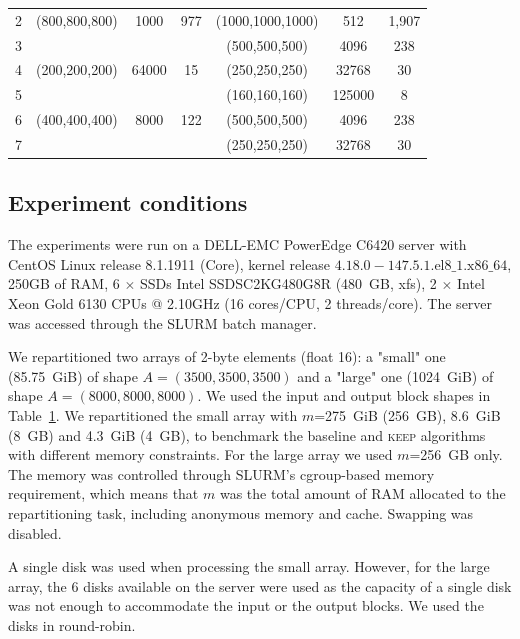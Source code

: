 \documentclass[sigconf, nonacm]{acmart}
\newcommand{\keep}[0]{\textsc{keep}\xspace}
\begin{document}
\begin{table}
\begin{tabular}{c|ccc|ccc}
   \rowcolor{black!10}
   2 & (800,800,800) & 1000     & 977    & (1000,1000,1000) & 512     &  1,907 \\
   \rowcolor{black!10}
   3 &               &        &           & (500,500,500)  & 4096    & 238 \\
   4 & (200,200,200) & 64000     & 15    & (250,250,250) & 32768     &  30 \\
   5 &               &        &           & (160,160,160)  & 125000    & 8 \\
   \rowcolor{black!10}
   6 & (400,400,400) & 8000     & 122    & (500,500,500) & 4096     &  238 \\
   \rowcolor{black!10}
   7 &               &        &           & (250,250,250)  & 32768    & 30 \\

   \end{tabular}
   \label{tab:exp}
\end{table}
\subsection{Experiment conditions}
The experiments were run on a DELL-EMC PowerEdge C6420 server
with CentOS Linux release 8.1.1911 (Core), kernel release
$4.18.0-147.5.1.\textrm{el}8\_1.\textrm{x}86\_64$, 250GB of RAM,
6 $\times$ SSDs Intel SSDSC2KG480G8R (480~GB, xfs),
2 $\times$ Intel Xeon Gold 6130 CPUs @ 2.10GHz (16 cores/CPU, 2 threads/core).
The server was accessed through the SLURM batch manager.

We repartitioned two arrays of 2-byte elements (float 16): a "small" one (85.75~GiB)  of shape $A=(3500,3500,3500)$
and a "large" one (1024~GiB) of shape $A=(8000,8000,8000)$.
We used the input and output block shapes in Table~\ref{tab:exp}.
We repartitioned the small array with $m$=275~GiB (256~GB), 8.6~GiB (8~GB)
 and 4.3~GiB (4~GB), to benchmark the baseline and \keep algorithms with different
 memory constraints. For the large array we used $m$=256~GB only.
The memory was controlled through SLURM's cgroup-based memory requirement,
which means that $m$ was the total amount of RAM allocated to the
repartitioning task, including anonymous memory and cache. Swapping was
disabled.

A single disk was used when processing the small array. However, for the
large array, the 6 disks available on the server were used as the capacity of a single disk was not
enough to accommodate the input or the output blocks. We used the disks in
round-robin.
\end{document}
